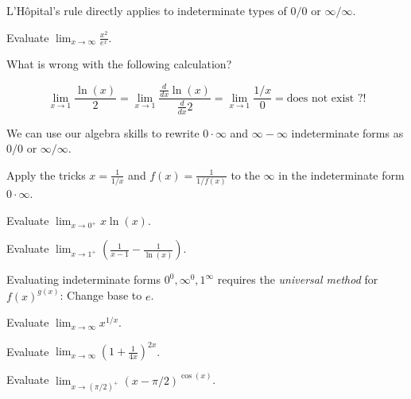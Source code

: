 \documentclass[../main.tex]{subfiles}
\begin{document}
L'H\^opital's rule directly applies to indeterminate types of \(0/0\) or \(\infty/\infty\).
\begin{example}
  Evaluate \(\lim_{x \to \infty} \frac{x^{2}}{e^{x}}\).

\end{example}

\begin{example}
  What is wrong with the following calculation?

  \[
    \lim_{x \to 1} \frac{\ln(x)}{2} = \lim_{x \to 1} \frac{\frac{d}{dx} \ln(x)}{\frac{d}{dx} 2} = \lim_{x \to 1} \frac{1/x}{0} = \text{does not exist ?!}
  \]
\end{example}

\clearpage

We can use our algebra skills to rewrite \(0 \cdot \infty\) and \(\infty - \infty\) indeterminate forms as \(0/0\) or \(\infty/\infty\).


\faStar{} Apply the tricks \(x = \frac{1}{1/x}\) and \(f(x) = \frac{1}{1/f(x)}\) to the \(\infty\) in the indeterminate form \(0 \cdot \infty\).

\begin{example}
  Evaluate \(\lim_{x \to 0^{+}} x \ln(x)\).

\end{example}

\begin{example}
  Evaluate \(\lim_{x \to 1^{+}} \left(\frac{1}{x-1} - \frac{1}{\ln(x)}\right)\).

\end{example}
\clearpage

Evaluating indeterminate forms \(0^{0}, \infty^{0}, 1^{\infty}\) requires the \emph{universal method} for \(f(x)^{g(x)}\): \faStar{} Change base to \(e\).


\begin{example}
  Evaluate \(\lim_{x \to \infty} x^{1/x}\).

\end{example}
\clearpage

\begin{example}
  Evaluate \(\lim_{x \to \infty} \left(1 + \frac{1}{4x}\right)^{2x}\).

\end{example}
\clearpage

\begin{example}
  Evaluate \(\lim_{x \to (\pi/2)^{+}} (x - \pi/2)^{\cos(x)}\).

\end{example}
\end{document}
